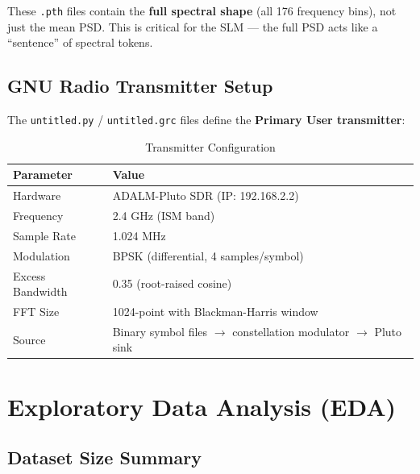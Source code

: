 \documentclass[12pt, a4paper]{article}
\begin{document}
\begin{notebox}
These \texttt{.pth} files contain the \textbf{full spectral shape} (all 176 frequency bins), not just the mean PSD. This is critical for the SLM — the full PSD acts like a ``sentence'' of spectral tokens.
\end{notebox}


\subsection{GNU Radio Transmitter Setup}

The \texttt{untitled.py} / \texttt{untitled.grc} files define the \textbf{Primary User transmitter}:

\begin{table}[H]
\centering
\caption{Transmitter Configuration}
\label{tab:transmitter}
\begin{tabular}{@{}ll@{}}
\toprule
\textbf{Parameter} & \textbf{Value} \\
\midrule
Hardware         & ADALM-Pluto SDR (IP: 192.168.2.2) \\
Frequency        & 2.4 GHz (ISM band) \\
Sample Rate      & 1.024 MHz \\
Modulation       & BPSK (differential, 4 samples/symbol) \\
Excess Bandwidth & 0.35 (root-raised cosine) \\
FFT Size         & 1024-point with Blackman-Harris window \\
Source           & Binary symbol files $\rightarrow$ constellation modulator $\rightarrow$ Pluto sink \\
\bottomrule
\end{tabular}
\end{table}


\section{Exploratory Data Analysis (EDA)}

\subsection{Dataset Size Summary}
\end{document}
